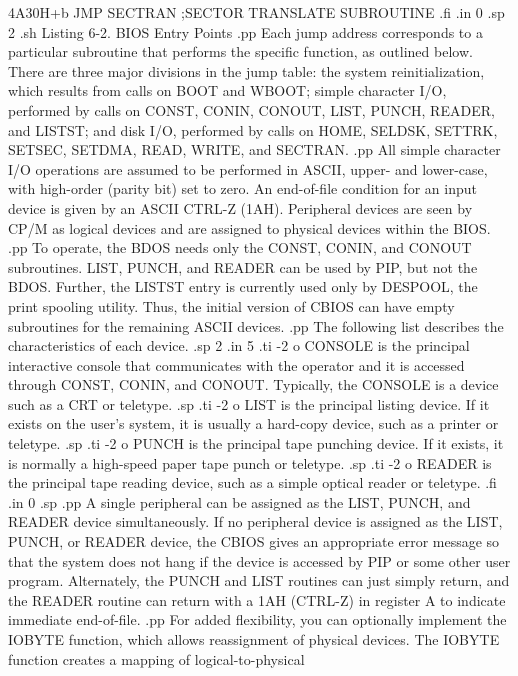 4A30H+b      JMP SECTRAN    ;SECTOR TRANSLATE
                             SUBROUTINE
.fi
.in 0
.sp 2
.sh
                 Listing 6-2.  BIOS Entry Points
.pp
Each jump address corresponds to a particular subroutine that performs the
specific function, as outlined below.  There are three major 
divisions in the jump table:  the system reinitialization, 
which results from calls on BOOT and WBOOT; simple character I/O, 
performed by calls on CONST, CONIN, CONOUT, LIST, PUNCH, READER, 
and LISTST; and disk I/O, performed by calls on HOME, SELDSK, 
SETTRK, SETSEC, SETDMA, READ, WRITE, and SECTRAN.
.pp
All simple character I/O operations are assumed to be performed 
in ASCII, upper- and lower-case, with high-order (parity bit) set 
to zero.  An end-of-file condition for an input device is given 
by an ASCII CTRL-Z (1AH).  Peripheral devices are seen by CP/M as 
logical devices and are assigned to physical devices within the 
BIOS.
.pp
To operate, the BDOS needs only the CONST, CONIN, and CONOUT 
subroutines.  LIST, PUNCH, and READER can be used by PIP, but not 
the BDOS.  Further, the LISTST entry is currently used only by 
DESPOOL, the print spooling utility.  Thus, the initial version 
of CBIOS can have empty subroutines for the remaining ASCII 
devices.
.pp
The following list describes the characteristics of each device.
.sp 2
.in 5
.ti -2
o CONSOLE is the principal interactive console that communicates with the
operator and it is accessed through CONST, CONIN, and CONOUT.  Typically, the
CONSOLE is a device such as a CRT or teletype.
.sp
.ti -2
o LIST is the principal listing device.  If it exists on the user's system,
it is usually a hard-copy device, such as a printer or teletype.
.sp
.ti -2
o PUNCH is the principal tape punching device.  If it exists, it is normally a
high-speed paper tape punch or teletype.
.sp
.ti -2
o READER is the principal tape reading device, such as a simple optical
reader or teletype.
.fi
.in 0
.sp
.pp
A single peripheral can be assigned as the LIST, PUNCH, and 
READER device simultaneously.  If no peripheral device is 
assigned as the LIST, PUNCH, or READER device, the CBIOS 
gives an appropriate error message so that the 
system does not hang if the device is accessed by PIP or some 
other user program.  Alternately, the PUNCH and LIST routines can 
just simply return, and the READER routine can return with a 1AH 
(CTRL-Z) in register A to indicate immediate end-of-file.
.pp
For added flexibility, you can optionally implement the 
IOBYTE function, which allows reassignment of physical devices.
The IOBYTE function creates a mapping of logical-to-physical 
